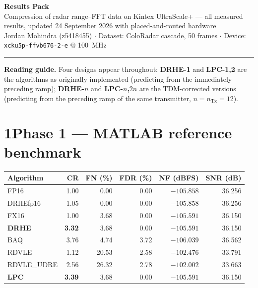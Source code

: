\documentclass[10pt,a4paper]{article}
\newcommand{\tno}[1]{\textbf{#1}}
\begin{document}
\begin{center}
\begin{minipage}{0.98\textwidth}\centering
{\Large\bfseries Results Pack}\\[3pt]
{\small Compression of radar range--FFT data on Kintex UltraScale+ ---
all measured results, updated 24 September 2026 with placed-and-routed hardware}\\[2pt]
{\footnotesize Jordan Mohindra (z5418455) \quad$\cdot$\quad
Dataset: ColoRadar cascade, 50 frames \quad$\cdot$\quad
Device: \texttt{xcku5p-ffvb676-2-e} @ \SI{100}{\mega\hertz}}
\end{minipage}
\end{center}
\vspace{2pt}\hrule\vspace{6pt}

\noindent\footnotesize
\textbf{Reading guide.} Four designs appear throughout:
\textbf{DRHE-1} and \textbf{LPC-1,2} are the algorithms as originally
implemented (predicting from the immediately preceding ramp);
\textbf{DRHE-$n$} and \textbf{LPC-$n$,$2n$} are the TDM-corrected versions
(predicting from the preceding ramp of the same transmitter, $n = n_{\mathrm{Tx}} = 12$).
\normalsize

\section{1\quad Phase 1 --- MATLAB reference benchmark}

\begin{center}
\begin{minipage}{0.98\textwidth}\centering
{}
\centering\small
\begin{tabular}{@{}lrrrrr@{}}
\toprule
Algorithm & CR & FN (\%) & FDR (\%) & NF (dBFS) & SNR (dB)\\
\midrule
FP16          & 1.00 & 0.00  & 0.00 & $-105.858$ & 36.256\\
DRHEfp16      & 1.05 & 0.00  & 0.00 & $-105.858$ & 36.256\\
FX16          & 1.00 & 3.68  & 0.00 & $-105.591$ & 36.150\\
\tno{DRHE}    & \tno{3.32} & 3.68 & 0.00 & $-105.591$ & 36.150\\
BAQ           & 3.76 & 4.74  & 3.72 & $-106.039$ & 36.562\\
RDVLE         & 1.12 & 20.53 & 2.58 & $-102.476$ & 33.791\\
RDVLE\_UDRE   & 2.56 & 26.32 & 2.78 & $-102.002$ & 33.663\\
\tno{LPC}     & \tno{3.39} & 3.68 & 0.00 & $-105.591$ & 36.150\\
\bottomrule
\end{tabular}
\end{minipage}
\end{center}
\end{document}
